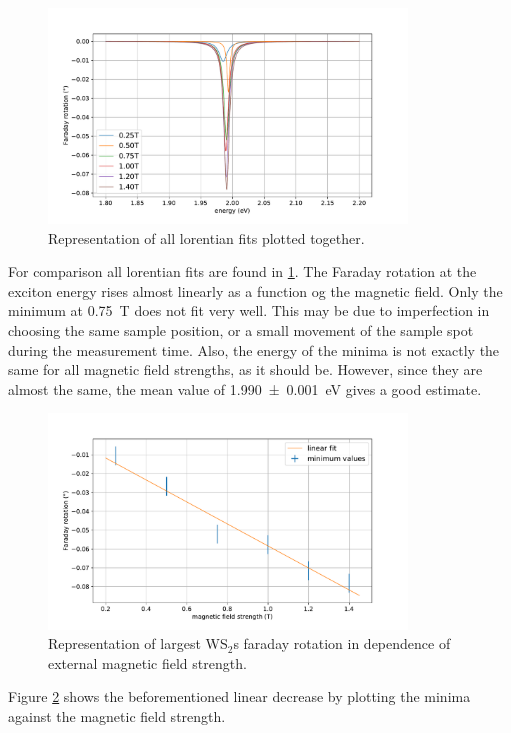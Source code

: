 \begin{figure}[!ht]
    \centering
    \includegraphics[width=0.85\textwidth]{plots/WS2_lorentians.pdf}
    \caption{Representation of all lorentian fits plotted together.}
    \label{fig_WS2_lorentians}
\end{figure}
For comparison all lorentian fits are found in \cref{fig_WS2_lorentians}.
The Faraday rotation at the exciton energy rises almost linearly as a function og the magnetic field.
Only the minimum at \SI{0.75}{\tesla} does not fit very well.
This may be due to imperfection in choosing the same sample position, or a small movement of the sample spot during the measurement time.
Also, the energy of the minima is not exactly the same for all magnetic field strengths, as it should be.
However, since they are almost the same, the mean value of \SI{1.990+-0.001}{\electronvolt} gives a good estimate.

\begin{figure}[!ht]
    \centering
    \includegraphics[width=0.85\textwidth]{plots/WS2_mins.pdf}
    \caption{Representation of largest WS$_2$s faraday rotation in dependence of external magnetic field strength.}
    \label{fig_WS2_minima}
\end{figure}
Figure \ref{fig_WS2_minima} shows the beforementioned linear decrease by plotting the minima against the magnetic field strength.

